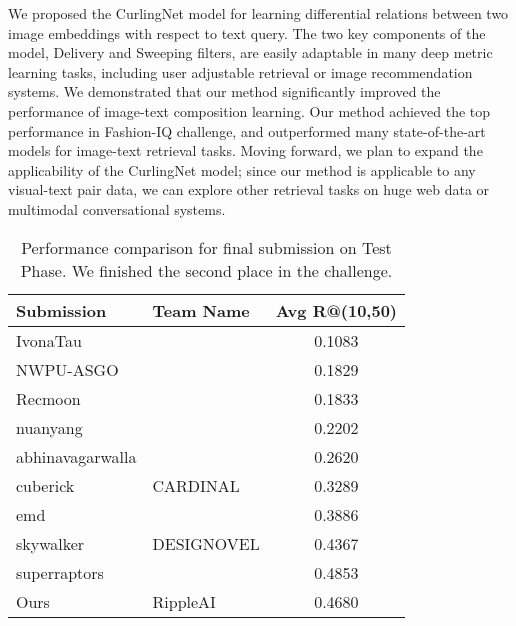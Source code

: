 \documentclass[10pt,twocolumn,letterpaper]{article}
\begin{document}
We proposed the CurlingNet model for learning differential relations between two image embeddings with respect to text query.
The two key components of the model, Delivery and Sweeping filters, are easily adaptable in many deep metric learning tasks, including user adjustable retrieval or image recommendation systems.
We demonstrated that our method significantly improved the performance of image-text composition learning.
Our method achieved the top performance in Fashion-IQ challenge, and outperformed many state-of-the-art models for image-text retrieval tasks.
Moving forward, we plan to expand the applicability of the CurlingNet model;
since our method is applicable to any visual-text pair data,
we can explore other retrieval tasks on huge web data or multimodal conversational systems.

\begin{table}
\begin{center}
\begin{tabular}{|l|l|c|}
\hline
Submission       & Team Name  &{\footnotesize Avg R@(10,50)}   \\ \hline\hline
IvonaTau          &            & 0.1083    \\
NWPU-ASGO         &            & 0.1829     \\
Recmoon           &            & 0.1833   \\
nuanyang          &            & 0.2202   \\
abhinavagarwalla  &            & 0.2620    \\
cuberick          & CARDINAL   & 0.3289   \\
emd               &            & 0.3886   \\
skywalker         & DESIGNOVEL & 0.4367   \\
superraptors      &            & 0.4853   \\ \hline
Ours              & RippleAI   & 0.4680  \\
\hline
\end{tabular}
\end{center}
\medskip
\caption{
Performance comparison for final submission on Test Phase. 
We finished the second place in the challenge.
}
\vspace{-3pt}

\label{tbl:results_ensemble}
\end{table}


{\small


}
\end{document}
